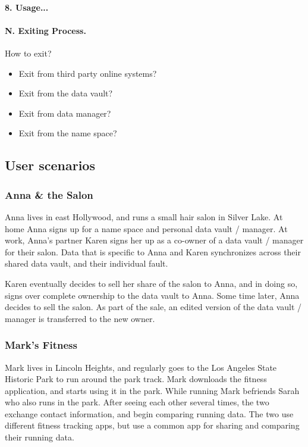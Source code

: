 \paragraph*{8. Usage...} 

\paragraph*{N. Exiting Process.}
How to exit?
\begin{itemize}
\item Exit from third party online systems? 
\item Exit from the data vault? 
\item Exit from data manager? 
\item Exit from the name space? 
\end{itemize}

\subsection{User scenarios}

\subsubsection{Anna \& the Salon}
Anna lives in east Hollywood, and runs a small hair salon in Silver Lake. At home Anna signs up for a name space and personal data vault / manager. At work, Anna's partner Karen signs her up as a co-owner of a data vault / manager for their salon. Data that is specific to Anna and Karen synchronizes across their shared data vault, and their individual fault.  

Karen eventually decides to sell her share of the salon to Anna, and in doing so, signs over complete ownership to the data vault to Anna. Some time later, Anna decides to sell the salon. As part of the sale, an edited version of the data vault / manager is transferred to the new owner. 

\subsubsection{Mark's Fitness}
Mark lives in Lincoln Heights, and regularly goes to the Los Angeles State Historic Park to run around the park track. Mark downloads the fitness application, and starts using it in the park. While running Mark befriends Sarah who also runs in the park. After seeing each other several times, the two exchange contact information, and begin comparing running data. The two use different fitness tracking apps, but use a common app for sharing and comparing their running data. 

